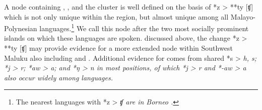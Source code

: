 A node containing ,
, and the  cluster is well defined on the basis of
*z > **ty [ʧ] which is not only unique within the region,
but almost unique among all Malayo-Polynesian languages.\footnote{
		The nearest languages with *z > \it{ʧ} are in Borneo \citep[279]{Smith2017a}.}
We call this node  after the two most socially
prominent islands on which these languages are spoken.
 discussed above, the change *z > **ty [ʧ] may provide evidence
for a more extended node within Southwest Maluku also including  and .
Additional evidence for  comes from shared *s
> \it{h, s}; *j > \it{r}; *aw > \it{a};
and *ŋ > \it{n} in most positions,
of which *j > \it{r}
and *-aw > \it{a} also occur widely among  languages.


